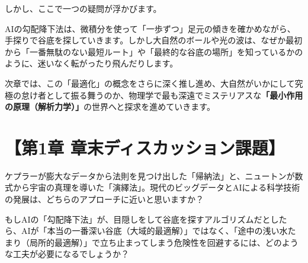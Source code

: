 しかし、ここで一つの疑問が浮かびます。

AIの勾配降下法は、微積分を使って「一歩ずつ」足元の傾きを確かめながら、手探りで谷底を探していきます。しかし大自然のボールや光の波は、なぜか最初から「一番無駄のない最短ルート」や「最終的な谷底の場所」を知っているかのように、迷いなく転がったり飛んだりします。

次章では、この「最適化」の概念をさらに深く推し進め、大自然がいかにして究極の怠け者として振る舞うのか、物理学で最も深遠でミステリアスな\textbf{「最小作用の原理（解析力学）」}の世界へと探求を進めていきます。

\section*{【第1章 章末ディスカッション課題】}

ケプラーが膨大なデータから法則を見つけ出した「帰納法」と、ニュートンが数式から宇宙の真理を導いた「演繹法」。現代のビッグデータとAIによる科学技術の発展は、どちらのアプローチに近いと思いますか？

もしAIの「勾配降下法」が、目隠しをして谷底を探すアルゴリズムだとしたら、AIが「本当の一番深い谷底（大域的最適解）」ではなく、「途中の浅い水たまり（局所的最適解）」で立ち止まってしまう危険性を回避するには、どのような工夫が必要になるでしょうか？




